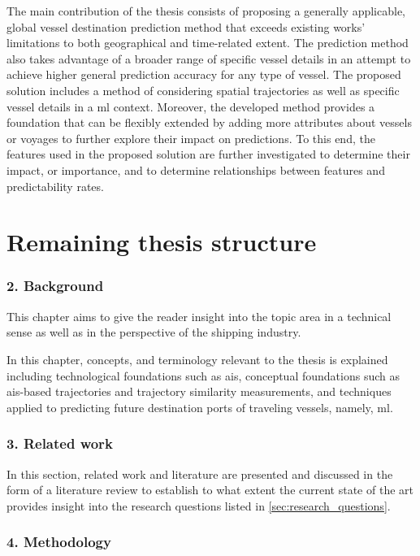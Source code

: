 The main contribution of the thesis consists of proposing a generally applicable, global vessel destination prediction method that exceeds existing works' limitations to both geographical and time-related extent. The prediction method also takes advantage of a broader range of specific vessel details in an attempt to achieve higher general prediction accuracy for any type of vessel. The proposed solution includes a method of considering spatial trajectories as well as specific vessel details in a \acrfull{ml} context. Moreover, the developed method provides a foundation that can be flexibly extended by adding more attributes about vessels or voyages to further explore their impact on predictions. To this end, the features used in the proposed solution are further investigated to determine their impact, or importance, and to determine relationships between features and predictability rates.

\section{Remaining thesis structure}

\subsubsection{2. Background}

This chapter aims to give the reader insight into the topic area in a technical sense as well as in the perspective of the shipping industry.

In this chapter, concepts, and terminology relevant to the thesis is explained including technological foundations such as \acrfull{ais}, conceptual foundations such as \acrshort{ais}-based trajectories and trajectory similarity measurements, and techniques applied to predicting future destination ports of traveling vessels, namely, \acrfull{ml}.

\subsubsection{3. Related work}

In this section, related work and literature are presented and discussed in the form of a literature review to establish to what extent the current state of the art provides insight into the research questions listed in \cref{sec:research_questions}.

\subsubsection{4. Methodology}


